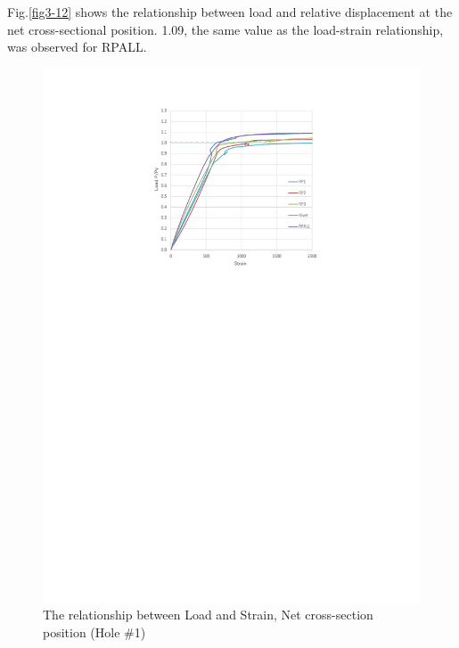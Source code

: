 Fig.\ref{fig3-12} shows the relationship between load and relative displacement at the net cross-sectional position. 1.09, the same value as the load-strain relationship, was observed for RPALL.

\begin{figure}[htbp]
    \centering
    \begin{minipage}[t]{0.42\textwidth}
    \includegraphics[width=\linewidth]{imgs/ch3/fig3-11.pdf}
    \caption{The relationship between Load and Strain, Net cross-section position (Hole \#1)}
    \label{fig3-11}  
    \end{minipage}
    \begin{minipage}[t]{0.42\textwidth}

\end{minipage}
\end{figure}

